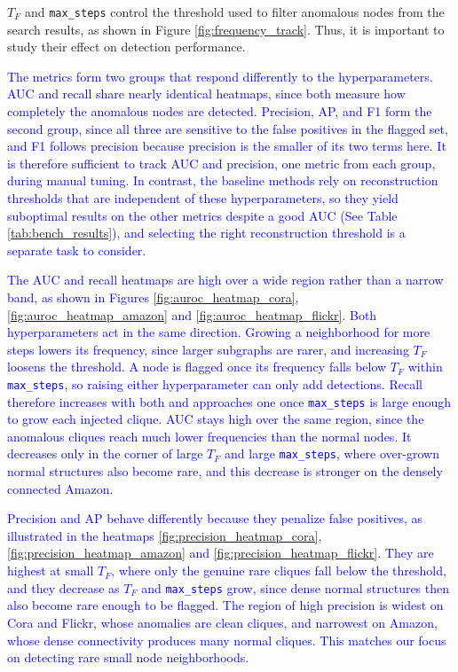 \documentclass[preprint,12pt]{elsarticle}
\newcommand{\new}[1]{\textcolor{blue}{#1}}
\theoremstyle{plain}
\theoremstyle{definition}
\theoremstyle{remark}
\begin{document}
$T_F$ and \texttt{max\_steps} control the threshold used to filter anomalous nodes from the search results, as shown in Figure \ref{fig:frequency_track}. Thus, it is important to study their effect on detection performance.

\new{The metrics form two groups that respond differently to the hyperparameters. AUC and recall share nearly identical heatmaps, since both measure how completely the anomalous nodes are detected. Precision, AP, and F1 form the second group, since all three are sensitive to the false positives in the flagged set, and F1 follows precision because precision is the smaller of its two terms here. It is therefore sufficient to track AUC and precision, one metric from each group, during manual tuning. In contrast, the baseline methods rely on reconstruction thresholds that are independent of these hyperparameters, so they yield suboptimal results on the other metrics despite a good AUC (See Table \ref{tab:bench_results}), and selecting the right reconstruction threshold is a separate task to consider.}

\new{The AUC and recall heatmaps are high over a wide region rather than a narrow band, as shown in Figures \ref{fig:auroc_heatmap_cora}, \ref{fig:auroc_heatmap_amazon} and \ref{fig:auroc_heatmap_flickr}. Both hyperparameters act in the same direction. Growing a neighborhood for more steps lowers its frequency, since larger subgraphs are rarer, and increasing $T_F$ loosens the threshold. A node is flagged once its frequency falls below $T_F$ within \texttt{max\_steps}, so raising either hyperparameter can only add detections. Recall therefore increases with both and approaches one once \texttt{max\_steps} is large enough to grow each injected clique. AUC stays high over the same region, since the anomalous cliques reach much lower frequencies than the normal nodes. It decreases only in the corner of large $T_F$ and large \texttt{max\_steps}, where over-grown normal structures also become rare, and this decrease is stronger on the densely connected Amazon.}

\new{Precision and AP behave differently because they penalize false positives, as illustrated in the heatmaps \ref{fig:precision_heatmap_cora}, \ref{fig:precision_heatmap_amazon} and \ref{fig:precision_heatmap_flickr}. They are highest at small $T_F$, where only the genuine rare cliques fall below the threshold, and they decrease as $T_F$ and \texttt{max\_steps} grow, since dense normal structures then also become rare enough to be flagged. The region of high precision is widest on Cora and Flickr, whose anomalies are clean cliques, and narrowest on Amazon, whose dense connectivity produces many normal cliques. This matches our focus on detecting rare small node neighborhoods.}
\end{document}
